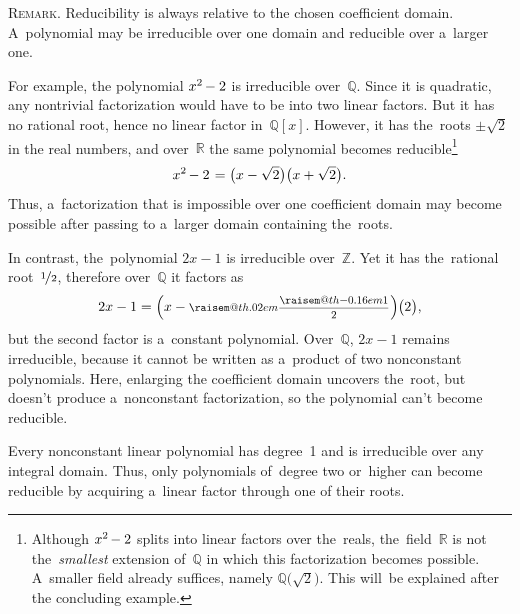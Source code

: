 \documentclass[11pt, twoside]{book}
\makeatletter
\newcommand\oex{\hspace{1ex}} %
\newcommand\fex{\hspace{.2ex}} %
\newcommand\nfex{\hspace{-0.2ex}} %
\newcommand\thex{\hspace{.1ex}} %
\newcommand\nthex{\hspace{-0.1ex}} %
\let\originalfootnote\footnote
\renewcommand{\footnote}[1]{\originalfootnote{\hspace{.25em}\parbox[t]{.96\textwidth}{#1}}}
\newcommand{\raisemath}[1]{\mathpalette{\raisem@th{#1}}}
\newcommand{\raisem@th}[3]{\raisebox{#1}{$#2#3$}}
\newcommand\onehalf{\raisemath{.02em}{\frac{\raisemath{-0.16em}{1}}{2}}}
\newcommand\smalldisplaystyleonehalf{\scalebox{.8}{$\displaystyle \onehalf$}\thex}
\makeatother
\begin{document}
\vspace{.5em}

\noindent
\textsc{Remark}.
Reducibility is always relative to the chosen coefficient domain.
A~polynomial may be irreducible over one domain and reducible over a~larger one.

\noindent
{}\oex
For example, the polynomial ${x^2 \nfex - 2}$ is irreducible over~$\mathbb{Q}$.
Since it is quadratic, any nontrivial factorization would have to be into two linear factors.
But it has no rational root, hence no linear factor in~$\mathbb{Q}[x]$.
However, it has the~roots ${\pm \sqrt{2}}$ in the real numbers,
and over~$\mathbb{R}$ the same polynomial becomes reducible\footnote{%
Although ${x^2 \nfex - 2}$ splits into linear factors over the~reals,
the~field~$\mathbb{R}$ is not the~\emph{smallest} extension of~$\mathbb{Q}$ in which this factorization becomes possible.
A~smaller field already suffices, namely ${\mathbb{Q}\bigl(\sqrt{2}\bigr)}$.
This will~be explained after the concluding example.}
%
\vspace{-1em}
\begin{equation*}
x^2 \nfex - 2 \fex = \bigl(x - \sqrt{2}\bigr) \bigl(x + \sqrt{2}\bigr)
.
\vspace{-0.25em}
\end{equation*}
%
Thus, a~factorization that is impossible over one coefficient domain may become possible after passing to a~larger domain containing the~roots.

\noindent
{}\oex
In contrast, the~polynomial ${2x - 1}$ is irreducible over~$\mathbb{Z}$.
Yet it has the~rational root~${\nicefrac{1}{2}}$,
therefore over~$\mathbb{Q}$ it factors as
%
\vspace{-0.5em}
\begin{equation*}
2x - 1 = \Bigl( x - \smalldisplaystyleonehalf \Bigr) \nthex \bigl(2\bigr)
,
\vspace{-0.5em}
\end{equation*}
%
but the second factor is a~constant polynomial.
Over~$\mathbb{Q}$, ${2x - 1}$ remains irreducible,
because it cannot be written as a~product of two nonconstant polynomials.
Here, enlarging the coefficient domain uncovers the~root, but doesn’t produce a~nonconstant factorization, so the polynomial can’t become reducible.

Every nonconstant linear polynomial has degree~1 and is irreducible over any integral domain.
Thus, only polynomials of~degree two or~higher can become reducible by acquiring a~linear factor through one of their roots.
\end{document}
